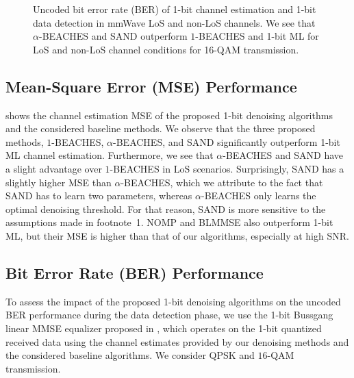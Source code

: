 \begin{figure*}[tp]
	\centering
	\hfill
	\hfill
	\hfill
	\vspace{-0.1cm}
	\caption{Uncoded bit error rate (BER) of 1-bit channel estimation and 1-bit data detection in mmWave LoS and non-LoS channels. We see that $\alpha$-BEACHES and SAND outperform $1$-BEACHES and 1-bit ML for LoS and non-LoS channel conditions for 16-QAM transmission. }
	\label{fig:BER}
\vspace{-0.37cm}	
\end{figure*}
%


\subsection{Mean-Square Error (MSE) Performance}
%
 shows the channel estimation MSE of the proposed 1-bit denoising algorithms and the considered baseline methods. We observe that the three proposed methods, $1$-BEACHES, $\alpha$-BEACHES, and SAND significantly outperform 1-bit ML channel estimation. Furthermore, we see that $\alpha$-BEACHES and SAND have a slight advantage over $1$-BEACHES in LoS scenarios. Surprisingly, SAND has a slightly higher MSE than $\alpha$-BEACHES, which we attribute to the fact that SAND has to learn two parameters, whereas $ \alpha$-BEACHES only learns the optimal denoising threshold. For that reason, SAND is more sensitive to the assumptions made in footnote~1.
%
NOMP and BLMMSE also outperform 1-bit ML, but their MSE is higher than that of our algorithms, especially at high SNR. 

\subsection{Bit Error Rate (BER) Performance}
%
To assess the impact of the proposed 1-bit denoising algorithms on the uncoded BER performance during the data detection phase, we use the 1-bit Bussgang linear MMSE equalizer proposed in \cite{nguyen19}, which operates on the 1-bit quantized received data using the channel estimates provided by our denoising methods and the considered baseline algorithms. We consider QPSK and $16$-QAM transmission.



